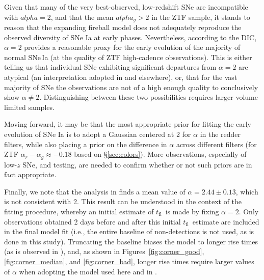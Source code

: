 \documentclass[twocolumn]{aastex63}
\newcommand{\tfl}{$t_\mathrm{fl}$}
\begin{document}
Given that many of the very best-observed, low-redshift SNe are incompatible
with $alpha = 2$, and that the mean $alpha_g > 2$ in the ZTF sample, it stands
to reason that the expanding fireball model does not adequately reproduce the
observed diversity of SNe Ia at early phases. Nevertheless, according to the
DIC, $\alpha=2$ provides a reasonable proxy for the early evolution of the
majority of normal SNe\,Ia (at the quality of ZTF high-cadence observations).
This is either telling us that individual SNe exhibiting significant
departures from $\alpha = 2$ are atypical (an interpretation adopted in
\citealt{Hosseinzadeh17,Miller18,Dimitriadis19} and elsewhere), or, that for
the vast majority of SNe the observations are not of a high enough quality to
conclusively show $\alpha \neq 2$. Distinguishing between these two
possibilities requires larger volume-limited samples.

Moving forward, it may be that the most appropriate prior for fitting the
early evolution of SNe Ia is to adopt a Gaussian centered at 2 for $\alpha$ in
the redder filters, while also placing a prior on the difference in $\alpha$
across different filters (for ZTF $\alpha_r - \alpha_g \approx -0.18$ based on
\S\ref{sec:colors}). More observations, especially of low-$z$ SNe, and
testing, are needed to confirm whether or not such priors are in fact
appropriate.

Finally, we note that the analysis in \citet{Firth15} finds a mean value of
$\alpha = 2.44 \pm 0.13$, which is not consistent with 2. This result can be
understood in the context of the \citet{Firth15} fitting procedure, whereby an
initial estimate of \tfl\ is made by fixing $\alpha = 2$. Only observations
obtained 2 days before and after this initial \tfl\ estimate are included in
the final model fit (i.e., the entire baseline of non-detections is not used,
as is done in this study). Truncating the baseline biases the model to longer
rise times (as is observed in \citealt{Firth15}), and, as shown in
Figures~\ref{fig:corner_good}, \ref{fig:corner_median}, and
\ref{fig:corner_bad}, longer rise times require larger values of
$\alpha$ when adopting the model used here and in \citet{Firth15}.
\end{document}
